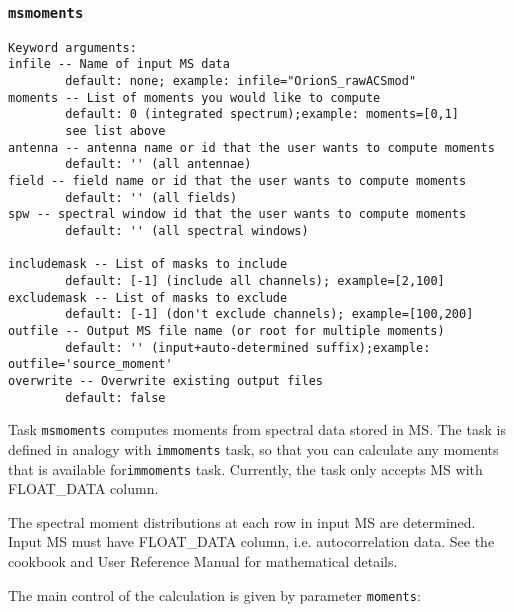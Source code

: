 \subsubsection{{\tt msmoments}}
\label{section:sd.sdtasks.tasks.sdmoments}

\begin{verbatim}
Keyword arguments:
infile -- Name of input MS data
        default: none; example: infile="OrionS_rawACSmod"
moments -- List of moments you would like to compute
        default: 0 (integrated spectrum);example: moments=[0,1]
        see list above
antenna -- antenna name or id that the user wants to compute moments
        default: '' (all antennae)
field -- field name or id that the user wants to compute moments
        default: '' (all fields)
spw -- spectral window id that the user wants to compute moments
        default: '' (all spectral windows)

includemask -- List of masks to include
        default: [-1] (include all channels); example=[2,100]
excludemask -- List of masks to exclude
        default: [-1] (don't exclude channels); example=[100,200]
outfile -- Output MS file name (or root for multiple moments)
        default: '' (input+auto-determined suffix);example: outfile='source_moment'
overwrite -- Overwrite existing output files
        default: false
\end{verbatim}

Task {\tt msmoments} computes moments from spectral data stored
in MS. The task is defined in analogy with {\tt immoments} task,
so that you can calculate any moments that is available
for{\tt  immoments} task. Currently, the task only accepts MS
with FLOAT\_DATA column.

The spectral moment distributions at each row in input MS are
determined. Input MS must have FLOAT\_DATA column, i.e. 
autocorrelation data.  
See the cookbook and User Reference Manual for
mathematical details.

The main control of the calculation is given by parameter {\tt moments}:
        
